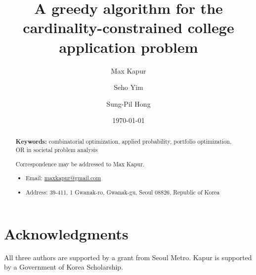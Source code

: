 \documentclass[11pt]{article} %
\title{A greedy algorithm for the cardinality-constrained
college application problem}
\author[1]{Max Kapur}
\author[2]{Seho Yim}
\author[3]{Sung-Pil Hong}
\affil[1,2,3]{Department of Industrial Engineering, Seoul National University}
\date{\today}
\theoremstyle{definition}
\begin{document}
\maketitle


\begin{abstract}



\textbf{Keywords:} combinatorial optimization, applied probability, portfolio optimization, OR in societal problem analysis

\vfill
Correspondence may be addressed to Max Kapur.
\begin{itemize}

\item[] Email: \url{maxkapur@gmail.com}

\item[] Address: 39-411, 1 Gwanak-ro, Gwanak-gu, Seoul 08826, Republic of Korea
\end{itemize}

\end{abstract}


\pagebreak

\tableofcontents



\section*{Acknowledgments}
All three authors are supported by a grant from Seoul Metro. Kapur is supported by a Government of Korea Scholarship.

\printbibliography
\end{document}
